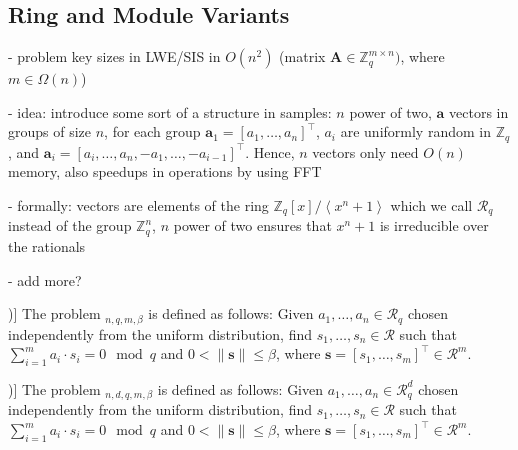 \documentclass[
  a4paper,  %
  twoside,  %
  bibliography=totoc,
  headsepline,
  cleardoublepage=empty,
  parskip=half,
  draft=false
]{scrbook}
\begin{document}
\subsection{Ring and Module Variants} 
- problem key sizes in LWE/SIS in $O(n^2)$ (matrix $\mathbf{A} \in \mathbb{Z}_q^{m \times n})$, where $m \in \Omega(n)$)%

- idea: introduce some sort of a structure in samples: $n$ power of two, $\mathbf{a}$ vectors in groups of size $n$, for each group $\mathbf{a}_1 = [a_1, \ldots, a_n]^\intercal$, $a_i$ are uniformly random in $\mathbb{Z}_q$, and $\mathbf{a}_i = [a_i, \ldots, a_n, -a_1, \ldots, -a_{i-1}]^\intercal$. Hence, $n$ vectors only need $O(n)$ memory, also speedups in operations by using FFT %

- formally: vectors are elements of the ring $\mathbb{Z}_q\left[x\right] / \left\langle x^n + 1 \right\rangle$ which we call $\mathcal{R}_q$ instead of the group $\mathbb{Z}_q^n$, $n$ power of two ensures that $x^n + 1$ is irreducible over the rationals%

- add more? %

\begin{definition}[Ring-SIS Problem [\citealp{LS15}, Definition 3.3])]
  The problem $_{n, q, m, \beta}$ is defined as follows: Given $a_1, \ldots, a_n \in \mathcal{R}_q$ chosen independently from the uniform distribution, find $s_1, \ldots, s_n \in \mathcal{R}$ such that $\sum_{i=1}^m a_i \cdot s_i = 0 \mod q$ and $0 < \| \mathbf{s}\| \leq \beta$, where $\mathbf{s} = \left[s_1, \ldots, s_m\right]^\intercal \in \mathcal{R}^m$.
\end{definition} %

\begin{definition}[Module-SIS Problem [\citealp{LS15}, Definition 3.3])]
  The problem $_{n, d, q, m, \beta}$ is defined as follows: Given $a_1, \ldots, a_n \in \mathcal{R}_q^d$ chosen independently from the uniform distribution, find $s_1, \ldots, s_n \in \mathcal{R}$ such that $\sum_{i=1}^m a_i \cdot s_i = 0\mod q$ and $0 < \| \mathbf{s}\| \leq \beta$, where $\mathbf{s} = \left[s_1, \ldots, s_m\right]^\intercal \in \mathcal{R}^m$.
\end{definition} %

\end{document}
